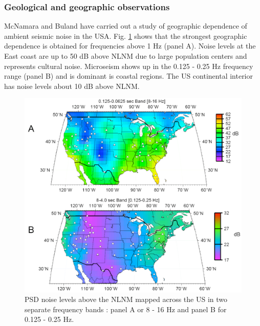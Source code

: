 \subsubsection{Geological and geographic observations}
McNamara and Buland \cite{mcnamarab} have carried out a study of geographic dependence of ambient seismic noise in the USA. Fig. \ref{OneGeologyPic} shows that the strongest geographic dependence is obtained for frequencies above 1 Hz (panel A). Noise levels at the East coast are up to 50 dB above NLNM due to large population centers and represents cultural noise. Microseism shows up in the 0.125 - 0.25 Hz frequency range (panel B) and is dominant is coastal regions. The US continental interior has noise levels about 10 dB above NLNM.
\begin{figure}[h!]
	\begin{center}
		 \includegraphics[width=15cm]{./Sec_SiteInfra/Figures/Geo.pdf}
		\caption{PSD noise levels above the NLNM mapped across the US in two separate frequency bands \cite{mcnamarab}: panel A or 8 - 16 Hz and panel B for 0.125 - 0.25 Hz.}
		\label{OneGeologyPic}
	\end{center}
\end{figure}


